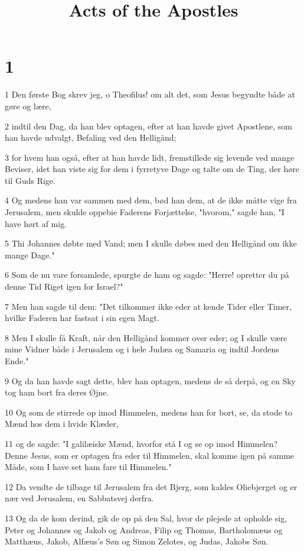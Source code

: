 

\title{Acts of the Apostles}


\chapter{1}

\par 1 Den første Bog skrev jeg, o Theofilus! om alt det, som Jesus begyndte både at gøre og lære,
\par 2 indtil den Dag, da han blev optagen, efter at han havde givet Apostlene, som han havde udvalgt, Befaling ved den Helligånd;
\par 3 for hvem han også, efter at han havde lidt, fremstillede sig levende ved mange Beviser, idet han viste sig for dem i fyrretyve Dage og talte om de Ting, der høre til Guds Rige.
\par 4 Og medens han var sammen med dem, bød han dem, at de ikke måtte vige fra Jerusalem, men skulde oppebie Faderens Forjættelse, "hvorom," sagde han, "I have hørt af mig.
\par 5 Thi Johannes døbte med Vand; men I skulle døbes med den Helligånd om ikke mange Dage."
\par 6 Som de nu vare forsamlede, spurgte de ham og sagde: "Herre! opretter du på denne Tid Riget igen for Israel?"
\par 7 Men han sagde til dem: "Det tilkommer ikke eder at kende Tider eller Timer, hvilke Faderen har fastsat i sin egen Magt.
\par 8 Men I skulle få Kraft, når den Helligånd kommer over eder; og I skulle være mine Vidner både i Jerusalem og i hele Judæa og Samaria og indtil Jordens Ende."
\par 9 Og da han havde sagt dette, blev han optagen, medens de så derpå, og en Sky tog ham bort fra deres Øjne.
\par 10 Og som de stirrede op imod Himmelen, medens han for bort, se, da stode to Mænd hos dem i hvide Klæder,
\par 11 og de sagde: "I galilæiske Mænd, hvorfor stå I og se op imod Himmelen? Denne Jesus, som er optagen fra eder til Himmelen, skal komme igen på samme Måde, som I have set ham fare til Himmelen."
\par 12 Da vendte de tilbage til Jerusalem fra det Bjerg, som kaldes Oliebjerget og er nær ved Jerusalem, en Sabbatsvej derfra.
\par 13 Og da de kom derind, gik de op på den Sal, hvor de plejede at opholde sig, Peter og Johannes og Jakob og Andreas, Filip og Thomas, Bartholomæus og Matthæus, Jakob, Alfæus's Søn og Simon Zelotes, og Judas, Jakobs Søn.

